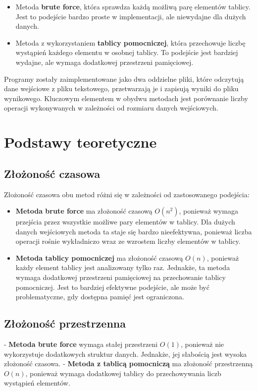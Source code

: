 \documentclass[a4paper,12pt]{article}
\begin{document}
\begin{itemize}
    \item Metoda \textbf{brute force}, która sprawdza każdą możliwą parę elementów tablicy. Jest to podejście bardzo proste w implementacji, ale niewydajne dla dużych danych.
    \item Metoda z wykorzystaniem \textbf{tablicy pomocniczej}, która przechowuje liczbę wystąpień każdego elementu w osobnej tablicy. To podejście jest bardziej wydajne, ale wymaga dodatkowej przestrzeni pamięciowej.
\end{itemize}

Programy zostały zaimplementowane jako dwa oddzielne pliki, które odczytują dane wejściowe z pliku tekstowego, przetwarzają je i zapisują wyniki do pliku wynikowego. Kluczowym elementem w obydwu metodach jest porównanie liczby operacji wykonywanych w zależności od rozmiaru danych wejściowych.

\newpage


\section{Podstawy teoretyczne}
\subsection{Złożoność czasowa}
Złożoność czasowa obu metod różni się w zależności od zastosowanego podejścia:

\begin{itemize}
    \item \textbf{Metoda brute force} ma złożoność czasową $O(n^2)$, ponieważ wymaga przejścia przez wszystkie możliwe pary elementów w tablicy. Dla dużych danych wejściowych metoda ta staje się bardzo nieefektywna, ponieważ liczba operacji rośnie wykładniczo wraz ze wzrostem liczby elementów w tablicy.
    \item \textbf{Metoda tablicy pomocniczej} ma złożoność czasową $O(n)$, ponieważ każdy element tablicy jest analizowany tylko raz. Jednakże, ta metoda wymaga dodatkowej przestrzeni pamięciowej na przechowanie tablicy pomocniczej. Jest to bardziej efektywne podejście, ale może być problematyczne, gdy dostępna pamięć jest ograniczona.
\end{itemize}

\subsection{Złożoność przestrzenna}
- \textbf{Metoda brute force} wymaga stałej przestrzeni $O(1)$, ponieważ nie wykorzystuje dodatkowych struktur danych. Jednakże, jej słabością jest wysoka złożoność czasowa.
- \textbf{Metoda z tablicą pomocniczą} ma złożoność przestrzenną $O(n)$, ponieważ wymaga dodatkowej tablicy do przechowywania liczb wystąpień elementów.
\end{document}
